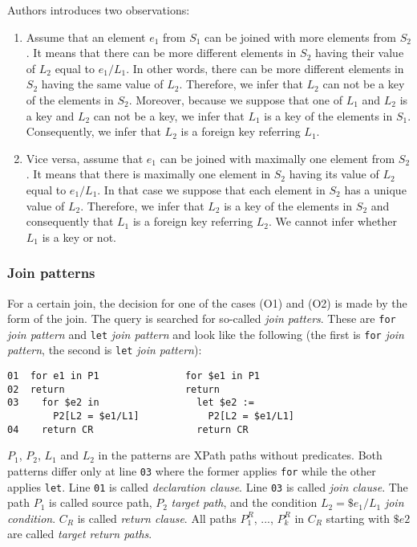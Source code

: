 Authors introduces two observations:
\begin{enumerate}
\renewcommand{\theenumi}{(O\arabic{enumi})}
\renewcommand{\labelenumi}{\theenumi}
\item Assume that an element $e_1$ from $S_1$ can be joined with more elements from $S_2$. It means that there can be more different elements in $S_2$ having their value of $L_2$ equal to $e_1/L_1$. In other words, there can be more different elements in $S_2$ having the same value of $L_2$. Therefore, we infer that $L_2$ can not be a key of the elements in $S_2$. Moreover, because we suppose that one of $L_1$ and $L_2$ is a key and $L_2$ can not be a key, we infer that $L_1$ is a key of the elements in $S_1$. Consequently, we infer that $L_2$ is a foreign key referring $L_1$.
\item Vice versa, assume that $e_1$ can be joined with maximally one element from $S_2$. It means that there is maximally one element in $S_2$ having its value of $L_2$ equal to $e_1/L_1$. In that case we suppose that each element in $S_2$ has a unique value of $L_2$. Therefore, we infer that $L_2$ is a key of the elements in $S_2$ and consequently that $L_1$ is a foreign key referring $L_2$. We cannot infer whether $L_1$ is a key or not.
\end{enumerate}

\subsubsection{Join patterns}
For a certain join, the decision for one of the cases (O1) and (O2) is made by the form of the join. The query is searched for so-called \emph{join patters}. These are \texttt{for} \emph{join pattern} and \texttt{let} \emph{join pattern} and look like the following (the first is \texttt{for} \emph{join pattern}, the second is \texttt{let} \emph{join pattern}):
\begin{verbatim}
01  for e1 in P1               for $e1 in P1
02  return                     return
03    for $e2 in                 let $e2 :=
        P2[L2 = $e1/L1]            P2[L2 = $e1/L1]
04    return CR                  return CR
\end{verbatim}

$P_1$, $P_2$, $L_1$ and $L_2$ in the patterns are XPath paths without predicates. Both patterns differ only at line \texttt{03} where the former applies \texttt{for} while the other applies \texttt{let}. Line \texttt{01} is called \emph{declaration clause}. Line \texttt{03} is called \emph{join clause}. The path $P_1$ is called source path, $P_2$ \emph{target path}, and the condition $L_2 = \$e_1/L_1$ \emph{join condition}. $C_R$ is called \emph{return clause}. All paths $P_1^R$, ..., $P_k^R$ in $C_R$
starting with $\$e2$ are called \emph{target return paths}.

